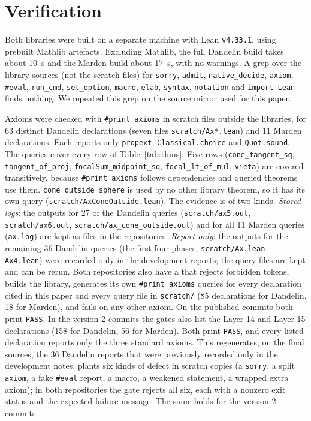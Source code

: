 \documentclass[11pt]{article}
\theoremstyle{remark}
\newcommand{\lean}[1]{\texttt{#1}}
\begin{document}
\section{Verification}\label{sec:verify}

Both libraries were built on a separate machine with Lean \texttt{v4.33.1}, using prebuilt Mathlib
artefacts. Excluding Mathlib, the full Dandelin build takes about 10~s and the Marden build about
17~s, with no warnings. A grep over the library sources (not the scratch files) for \lean{sorry},
\lean{admit}, \lean{native\_decide}, \lean{axiom}, \lean{\#eval}, \lean{run\_cmd},
\lean{set\_option}, \lean{macro}, \lean{elab}, \lean{syntax}, \lean{notation} and
\lean{import Lean} finds nothing. We repeated this grep on the source mirror used for this paper.

Axioms were checked with \lean{\#print axioms} in scratch files outside the libraries, for 63
distinct Dandelin declarations (seven files \texttt{scratch/Ax*.lean}) and 11 Marden declarations.
Each reports only \lean{propext}, \lean{Classical.choice} and \lean{Quot.sound}. The queries cover
every row of Table~\ref{tab:thms}. Five rows (\lean{cone\_tangent\_sq}, \lean{tangent\_of\_proj},
\lean{focalSum\_midpoint\_sq}, \lean{focal\_lt\_of\_mul}, \lean{vieta}) are covered transitively,
because \lean{\#print axioms} follows dependencies and queried theorems use them.
\lean{cone\_outside\_sphere} is used by no other library theorem, so it has its own query
(\texttt{scratch/AxConeOutside.lean}).
The evidence is of two kinds. \emph{Stored logs}: the outputs for 27 of the Dandelin queries
(\texttt{scratch/ax5.out}, \texttt{scratch/ax6.out}, \texttt{scratch/ax\_cone\_outside.out}) and
for all 11 Marden queries (\texttt{ax.log}) are kept as files in the repositories.
\emph{Report-only}: the outputs for the remaining 36 Dandelin queries (the first four phases,
\texttt{scratch/Ax.lean}--\texttt{Ax4.lean}) were recorded only in the development reports; the
query files are kept and can be rerun.
Both repositories also have a  that rejects forbidden tokens, builds the library,
generates its own \lean{\#print axioms} queries for every declaration cited in this paper and every
query file in \texttt{scratch/} (85 declarations for Dandelin, 18 for Marden), and fails on any
other axiom. On the published commits both print \texttt{PASS}. In the version-2 commits the
gates also list the Layer-14 and Layer-15 declarations (158 for Dandelin, 56 for Marden). Both
print \texttt{PASS}, and every listed declaration reports only the three standard axioms. This regenerates, on the final
sources, the 36 Dandelin reports that were previously recorded only in the development notes.
 plants six kinds of defect in scratch copies (a \lean{sorry}, a split
\lean{axiom}, a fake \lean{\#eval} report, a macro, a weakened statement, a wrapped extra axiom); in
both repositories the gate rejects all six, each with a nonzero exit status and the expected
failure message. The same holds for the version-2 commits.
\end{document}
